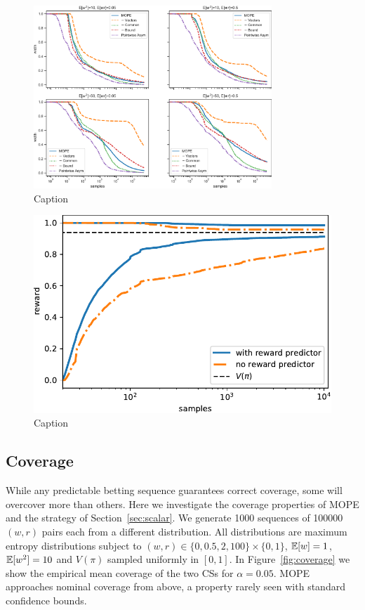 \begin{figure}
    \centering
    \includegraphics[width=0.8\textwidth]{width}
    \caption{Caption}
    \label{fig:width}
\end{figure}

\begin{figure}
    \centering
    \includegraphics[width=0.75\linewidth]{predictor}
    \caption{Caption}
    \label{fig:predictor}
\end{figure}

\subsection{Coverage} \label{sec:coverage}
While any predictable betting sequence
guarantees correct coverage, some will overcover more than
others. Here we investigate the coverage properties of
MOPE and the strategy of Section~\ref{sec:scalar}.
We generate 1000 sequences of 100000 $(w,r)$ pairs each from a different
distribution. All distributions are maximum entropy distributions subject to
$(w,r) \in \{0, 0.5, 2, 100\} \times \{0,1\}$, $\mathbb{E}[w]=1$, $\mathbb{E}[w^2]=10$
and $V(\pi)$ sampled uniformly in $[0,1]$. In Figure~\ref{fig:coverage} we show
the empirical mean coverage of the two CSs for $\alpha=0.05$. 
MOPE approaches nominal coverage from above,
a property rarely seen with standard confidence bounds.

